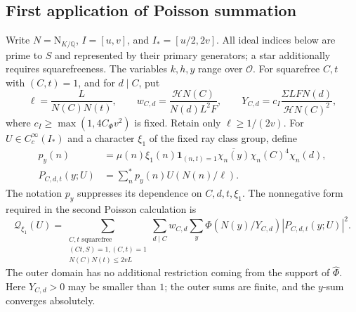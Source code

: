 \documentclass[11pt,a4paper]{article}
\numberwithin{equation}{section}
\numberwithin{figure}{section}
\theoremstyle{definition}
\theoremstyle{remark}
\newcommand{\Q}{\mathbb Q}
\newcommand{\NK}{\mathrm N_{K/\Q}}
\newcommand{\OO}{\mathcal O}
\newcommand{\ind}{\mathbf1}
\begin{document}
\subsection{First application of Poisson summation}
Write $N=\NK$, $I=[u,v]$, and $I_*=[u/2,2v]$.
All ideal indices below are prime to $S$ and represented by their
primary generators; a star additionally requires squarefreeness.
The variables $k,h,y$ range over $\OO$.
For squarefree $C,t$ with $(C,t)=1$, and for $d\mid C$, put
\[
 \ell=\frac{L}{N(C)N(t)},\qquad
 w_{C,d}=\frac{\mathcal H N(C)}{N(d)L^2F},\qquad
 Y_{C,d}=c_I\frac{\Sigma LFN(d)}{\mathcal H N(C)^2},
\]
where $c_I\ge\max(1,4C_\Phi v^2)$ is fixed. Retain only
$\ell\ge1/(2v)$. For $U\in C_c^\infty(I_*)$ and a character
$\xi_1$ of the fixed ray class group, define
\begin{equation}\label{eq:P}
 \begin{aligned}
 p_y(n)&=\mu(n)\xi_1(n)\ind_{(n,t)=1}
       \overline{\chi_n(y)}\chi_n(C)^4\chi_n(d),\\
 P_{C,d,t}(y;U)&=\sum_n^*p_y(n)U(N(n)/\ell).
 \end{aligned}
\end{equation}
The notation $p_y$ suppresses its dependence on $C,d,t,\xi_1$.
The nonnegative form required in the second Poisson calculation is
\begin{equation}\label{eq:first-transfer-forms}
 \mathcal Q_{\xi_1}(U)=
 \sum_{\substack{C,t\text{ squarefree}\\(Ct,S)=1, (C,t)=1\\
                  N(C)N(t)\le2vL}}
 \sum_{d\mid C}w_{C,d}
\sum_y\Phi(N(y)/Y_{C,d})|P_{C,d,t}(y;U)|^2.
\end{equation}
The outer domain has no additional restriction coming from the support of $\widehat\Phi$. Here $Y_{C,d}>0$ may be smaller than $1$; the outer
sums are finite, and the $y$-sum converges absolutely.
\end{document}
